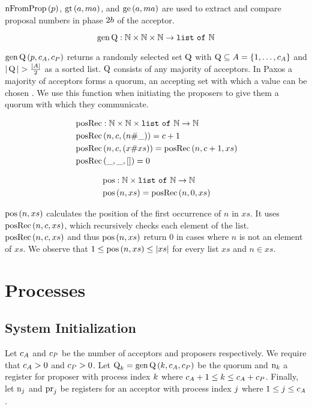 $\operatorname{nFromProp}\left(p \right)$, $\operatorname{gt}\left(a, ma\right)$, and $\operatorname{ge}\left(a, ma\right)$ are used to extract and compare proposal numbers in phase $2b$ of the acceptor.

\[\operatorname{gen\operatorname{Q}} : \mathbb{N} \times \mathbb{N} \times \mathbb{N} \to \mathtt{list\ of\ } \mathbb{N}\]

$\operatorname{gen\operatorname{Q}}\left(p, c_A, c_P\right)$ returns a randomly selected set $\operatorname{Q}$ with $\operatorname{Q} \subseteq A = \left\{1, \ldots, c_A\right\}$ and $|\operatorname{Q}| > \frac{|A|}{2}$ as a sorted list.
$\operatorname{Q}$ consists of any majority of acceptors.
In Paxos a majority of acceptors forms a quorum, \ie an accepting set with which a value can be chosen \cite{Lamport06}.
We use this function when initiating the proposers to give them a quorum with which they communicate.

\begin{align*}
&\operatorname{posRec} : \mathbb{N} \times \mathbb{N} \times \mathtt{list\ of\ } \mathbb{N} \to \mathbb{N}\\
&\operatorname{posRec}\left(n, c, \left(n \mathtt{\#} \mathtt{\_}\right)\right) = c + 1\\
&\operatorname{posRec}\left(n, c, \left(x \mathtt{\#} xs\right)\right) = \operatorname{posRec}\left(n, c + 1, xs\right)\\
&\operatorname{posRec}\left(\mathtt{\_}, \mathtt{\_}, \mathtt{[]}\right) = 0
\end{align*}

\begin{align*}
&\operatorname{pos} : \mathbb{N} \times \mathtt{list\ of\ } \mathbb{N} \to \mathbb{N}\\
&\operatorname{pos}\left(n, xs\right) = \operatorname{posRec}\left(n, 0, xs\right)
\end{align*}

$\operatorname{pos}\left(n, xs\right)$ calculates the position of the first occurrence of $n$ in $xs$.
It uses $\operatorname{posRec}\left(n, c, xs\right)$, which recursively checks each element of the list.
$\operatorname{posRec}\left(n, c, xs\right)$ and thus $\operatorname{pos}\left(n, xs\right)$ return $0$ in cases where $n$ is not an element of $xs$.
We observe that $1 \leq \operatorname{pos}\left(n, xs\right) \leq |xs|$ for every list $xs$ and $n \in xs$.

\section{Processes}
\subsection{System Initialization}
Let $c_A$ and $c_P$ be the number of acceptors and proposers respectively.
We require that $c_A > 0$ and $c_P > 0$.
Let $\operatorname{Q}_{k} = \operatorname{gen\operatorname{Q}}\left(k, c_A, c_P\right)$ be the quorum and $\operatorname{n}_{k}$ a register for proposer with process index $k$ where $c_A + 1 \leq k \leq c_A + c_P$.
Finally, let $\operatorname{n}_{j}$ and $\operatorname{pr}_{j}$ be registers for an acceptor with process index $j$ where $1 \leq j \leq c_A$.

